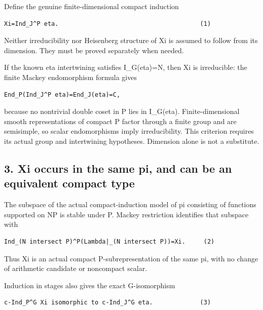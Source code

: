 Define the genuine finite-dimensional compact induction

\begin{Verbatim}[fontsize=\small,breaklines=true,breakanywhere=true]
Xi=Ind_J^P eta.                                       (1)
\end{Verbatim}

Neither irreducibility nor Heisenberg structure of Xi is assumed to
follow from its dimension. They must be proved separately when needed.

If the known eta intertwining satisfies I\_G(eta)=N, then Xi is
irreducible: the finite Mackey endomorphism formula gives

\begin{Verbatim}[fontsize=\small,breaklines=true,breakanywhere=true]
End_P(Ind_J^P eta)=End_J(eta)=C,
\end{Verbatim}

because no nontrivial double coset in P lies in I\_G(eta).
Finite-dimensional smooth representations of compact P factor through a
finite group and are semisimple, so scalar endomorphisms imply
irreducibility. This criterion requires its actual group and intertwining hypotheses. Dimension alone is not a substitute.

\hypertarget{lowrank_contract-xi-occurs-in-the-same-pi-and-can-be-an-equivalent-compact-type}{%
\subsection{3. Xi occurs in the same pi, and can be an equivalent
compact
type}\label{lowrank_contract-xi-occurs-in-the-same-pi-and-can-be-an-equivalent-compact-type}}

The subspace of the actual compact-induction model of pi consisting of
functions supported on NP is stable under P. Mackey restriction
identifies that subspace with

\begin{Verbatim}[fontsize=\small,breaklines=true,breakanywhere=true]
Ind_(N intersect P)^P(Lambda|_(N intersect P))=Xi.     (2)
\end{Verbatim}

Thus Xi is an actual compact P-subrepresentation of the same pi, with no
change of arithmetic candidate or noncompact scalar.

Induction in stages also gives the exact G-isomorphism

\begin{Verbatim}[fontsize=\small,breaklines=true,breakanywhere=true]
c-Ind_P^G Xi isomorphic to c-Ind_J^G eta.             (3)
\end{Verbatim}

